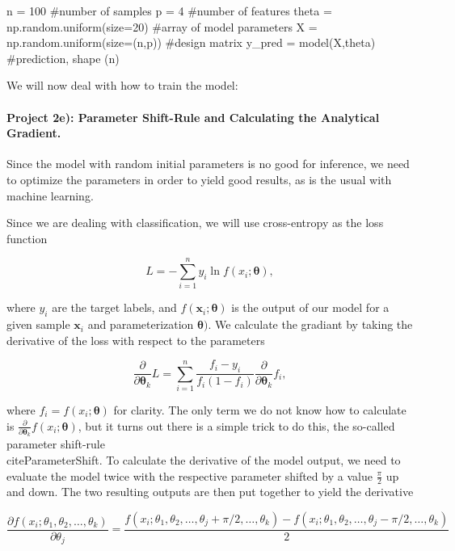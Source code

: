\documentclass[%
oneside,                 %
final,                   %
10pt]{article}
\begin{document}
\bpycod
n = 100 #number of samples
p = 4 #number of features
theta = np.random.uniform(size=20) #array of model parameters
X = np.random.uniform(size=(n,p)) #design matrix
y_pred = model(X,theta) #prediction, shape (n)
\epycod



We will now deal with how to train the model:

\paragraph{Project 2e): Parameter Shift-Rule and Calculating the Analytical Gradient.}
Since the model with random initial parameters is no good for
inference, we need to optimize the parameters in order to yield good
results, as is the usual with machine learning.

Since we are dealing with classification, we will use cross-entropy as the loss function

\begin{equation*}
    L = -\sum_{i=1}^{n}{y_i \ln{f(x_i;\boldsymbol{\theta})}},
\end{equation*}

where $y_i$ are the target labels, and
$f(\boldsymbol{x}_i;\boldsymbol{\theta})$ is the output of our model
for a given sample $\boldsymbol{x}_i$ and parameterization
$\boldsymbol{\theta})$. We calculate the gradiant by taking the
derivative of the loss with respect to the parameters

\begin{equation*}
    \frac{\partial}{\partial \boldsymbol{\theta}_k}L = \sum_{i=1}^{n}{\frac{f_i - y_i}{f_i(1 - f_i)}} \frac{\partial}{\partial \boldsymbol{\theta}_k}f_i,
\end{equation*}

where $f_i = f(x_i;\boldsymbol{\theta})$ for clarity. The only term we do not know how to calculate is $\frac{\partial}{\partial \boldsymbol{\theta}_k}f(x_i;\boldsymbol{\theta})$, but it turns out there is a simple trick to do this, the so-called parameter shift-rule \\cite{ParameterShift}. To calculate the derivative of the model output, we need to evaluate the model twice with the respective parameter shifted by a value $\frac{\pi}{2}$ up and down. The two resulting outputs are then put together to yield the derivative



\begin{equation*}
    \frac{\partial f(x_i; \theta_1, \theta_2, \dots, \theta_k)}{\partial \theta_j}  = \frac{f(x_i; \theta_1, \theta_2, \dots, \theta_j + \pi /2, \dots, \theta_k) -f(x_i; \theta_1, \theta_2, \dots, \theta_j - \pi /2, \dots, \theta_k)}{2}
\end{equation*}
\end{document}
